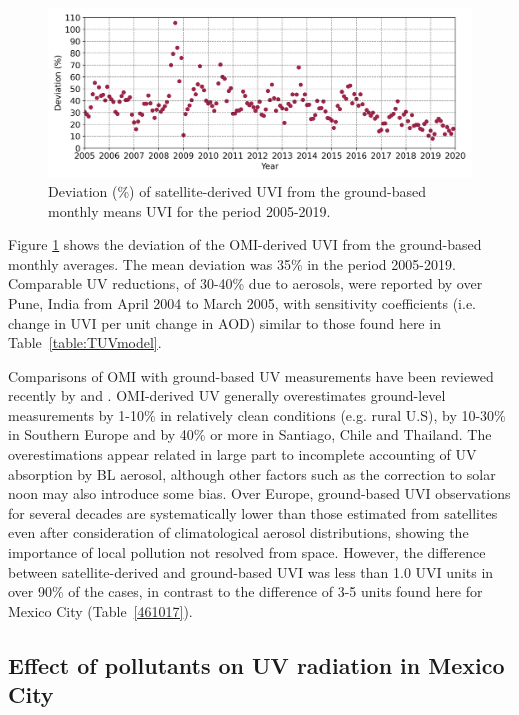 \documentclass[journal=jacsat,manuscript=article]{achemso}
\begin{document}
\begin{figure}[H]
  \centering
  \includegraphics[width=0.95\columnwidth]{figures/Monthly_mean_RD.png}
  \caption{Deviation (\%) of satellite-derived UVI from the ground-based monthly means UVI for the period 2005-2019.}
  \label{fig:percentage_relative_difference}
\end{figure}

Figure \ref{fig:percentage_relative_difference} shows the deviation of the OMI-derived UVI from the ground-based monthly averages. The mean deviation
was 35\% in the period 2005-2019. Comparable UV reductions, of 30-40\% due to aerosols, were reported by
\citet{Panicker_2009} over Pune, India from April 2004 to
March 2005, with sensitivity coefficients (i.e. change in UVI per unit
change in AOD) similar to those found here in Table~\ref{table:TUVmodel}.

Comparisons of OMI with ground-based UV measurements have been reviewed
recently by \citet{Zhang_2019} and \citet{Vitt_2020}.
OMI-derived UV generally overestimates
ground-level measurements by 1-10\% in relatively clean conditions (e.g.
rural U.S), by 10-30\% in Southern Europe and by 40\% or more in
Santiago, Chile\citep{Cabrera_2012} and Thailand\citep{Janjai_2013}. The
overestimations appear related in large part to incomplete accounting of
UV absorption by BL aerosol, although other factors such as the
correction to solar noon may also introduce some
bias.\citep{Zhang_2019} Over Europe, ground-based UVI observations for
several decades are systematically lower than those estimated from
satellites even after consideration of climatological aerosol
distributions, showing the importance of local pollution not resolved
from space.\citep{Vitt_2020} However, the difference between
satellite-derived and ground-based UVI was less than 1.0 UVI units in
over 90\% of the cases, in contrast to the difference of 3-5 units found
here for Mexico City (Table~{\ref{461017}}).

\subsection{Effect of pollutants on UV radiation in Mexico City}
\end{document}
